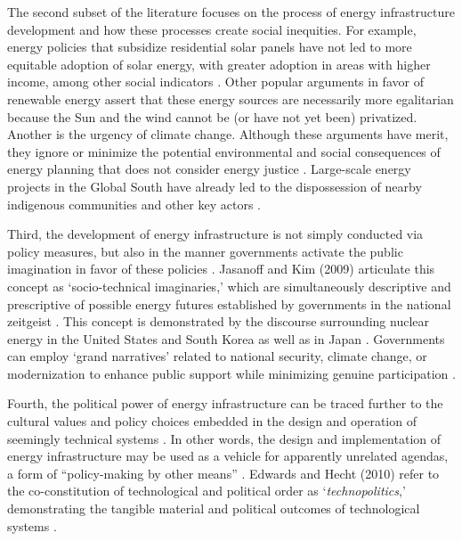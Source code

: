 The second subset of the literature focuses on the process of energy
infrastructure development and how these processes create social inequities. For
example, energy policies that subsidize residential solar panels have not led to
more equitable adoption of solar energy, with greater adoption in areas with
higher income, among other social indicators \cite{reames_distributive_2020}.
Other popular arguments in favor of renewable energy assert that these energy
sources are necessarily more egalitarian because the Sun and the wind cannot be
(or have not yet been) privatized. Another is the urgency of climate change.
Although these arguments have merit, they ignore or minimize the potential
environmental and social consequences of energy planning that does not consider
energy justice \cite{jones_building_2013}. Large-scale energy projects in the
Global South have already led to the dispossession of nearby indigenous
communities and other key actors \cite{yenneti_spatial_2016,
barragan-contreras_procedural_2022}.

Third, the development of energy infrastructure is not simply conducted via
policy measures, but also in the manner governments activate the public
imagination in favor of these policies
\cite{bridge_energy_2018,jasanoff_containing_2009}. Jasanoff and Kim (2009)
articulate this concept as `socio-technical imaginaries,' which are
simultaneously descriptive and prescriptive of possible energy futures
established by governments in the national zeitgeist
\cite{jasanoff_containing_2009}. This concept is demonstrated by the discourse
surrounding nuclear energy in the United States and South Korea
\cite{jasanoff_containing_2009} as well as in Japan
\cite{valentine_energy_2019}. Governments can employ `grand narratives' related
to national security, climate change, or modernization to enhance public support
while minimizing genuine participation \cite{bridge_energy_2018}.

Fourth, the political power of energy infrastructure can be traced further to
the cultural values and policy choices embedded in the design and operation of
seemingly technical systems \cite{bridge_energy_2018}. In other words, the
design and implementation of energy infrastructure may be used as a vehicle for
apparently unrelated agendas, a form of ``policy-making by other means''
\cite{bridge_energy_2018, clausewitz_chapter_1918}. Edwards and Hecht (2010)
refer to the co-constitution of technological and political order as
`\textit{technopolitics},' demonstrating the tangible material and political
outcomes of technological systems \cite{edwards_history_2010}.

